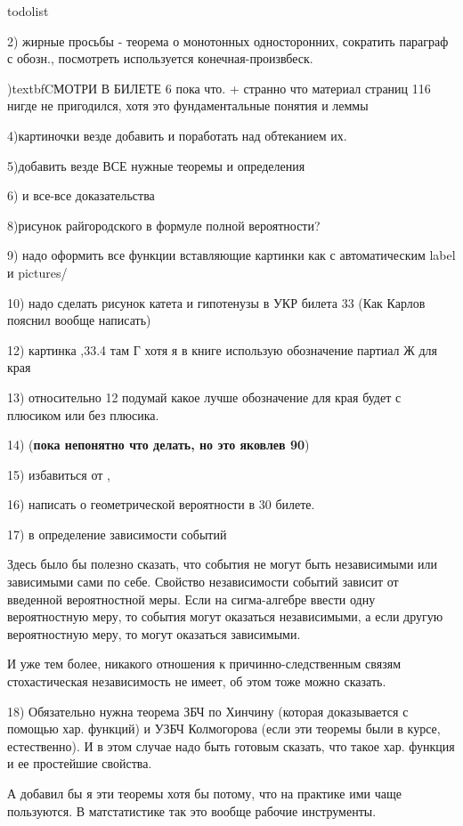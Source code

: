 todolist

2) жирные просьбы - теорема о монотонных односторонних, сократить параграф с обозн., посмотреть используется конечная-произвбеск.

\3)textbf{CМОТРИ В БИЛЕТЕ 6 пока что. + странно что материал страниц 116 нигде не пригодился, хотя это фундаментальные понятия и леммы}
 
4)картиночки везде добавить и поработать над обтеканием их.

5)добавить везде ВСЕ нужные теоремы и определения
 
6) и все-все доказательства
 
8)рисунок райгородского в формуле полной вероятности?
 
9) надо оформить все функции вставляющие картинки как \usepict с автоматическим label и pictures/
 
10) надо сделать рисунок катета и гипотенузы в УКР билета 33
(Как Карлов пояснил вообще написать)
 
12) картинка ,33.4 там Г хотя я в книге использую обозначение партиал Ж для края

13) относительно 12 подумай какое лучше обозначение для края будет с плюсиком или без плюсика. 

14) (\textbf{пока непонятно что делать, но это яковлев 90})

15) избавиться от \fa, \ex 

16) написать о геометрической вероятности в 30 билете.

17) в определение зависимости событий

Здесь было бы полезно сказать, что события не могут быть независимыми или зависимыми сами по себе. Свойство независимости событий зависит от введенной вероятностной меры. Если на сигма-алгебре ввести одну вероятностную меру, то события могут оказаться независимыми, а если другую вероятностную меру, то могут оказаться зависимыми.

И уже тем более, никакого отношения к причинно-следственным связям стохастическая независимость не имеет, об этом тоже можно сказать.

18) Обязательно нужна теорема ЗБЧ по Хинчину (которая доказывается с помощью хар. функций) и УЗБЧ Колмогорова (если эти теоремы были в курсе, естественно). И в этом случае надо быть готовым сказать, что такое хар. функция и ее простейшие свойства.

А добавил бы я эти теоремы хотя бы потому, что на практике ими чаще  пользуются. В матстатистике так это вообще рабочие инструменты.

